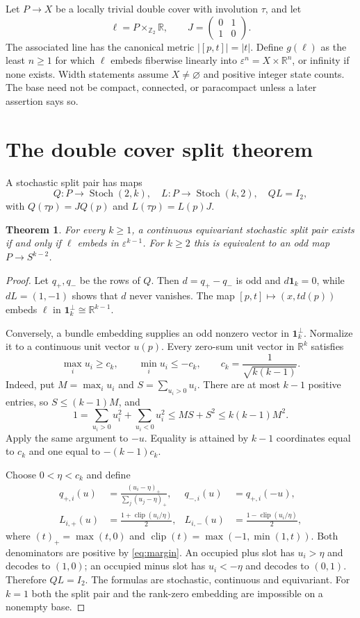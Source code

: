 \documentclass[11pt]{article}
\newtheorem{theorem}{Theorem}[section]
\theoremstyle{definition}
\newcommand{\R}{\mathbb R}
\newcommand{\one}{\mathbf 1}
\newcommand{\eps}{\varepsilon}
\newcommand{\St}{\operatorname{Stoch}}
\newcommand{\clip}{\operatorname{clip}}
\begin{document}
Let $P\to X$ be a locally trivial double cover with involution $\tau$, and let
\[
 \ell=P\times_{\mathbb Z_2}\R,\qquad
 J=\begin{pmatrix}0&1\\1&0\end{pmatrix}.
\]
The associated line has the canonical metric $|[p,t]|=|t|$. Define $g(\ell)$ as the least $n\geq1$ for which $\ell$ embeds fiberwise linearly into $\eps^n=X\times\R^n$, or infinity if none exists. Width statements assume $X\ne\varnothing$ and positive integer state counts. The base need not be compact, connected, or paracompact unless a later assertion says so.

\section{The double cover split theorem}
A stochastic split pair has maps
\[
 Q:P\to\St(2,k),\quad L:P\to\St(k,2),\quad QL=I_2,
\]
with $Q(\tau p)=JQ(p)$ and $L(\tau p)=L(p)J$.

\begin{theorem}\label{thm:double}
For every $k\geq1$, a continuous equivariant stochastic split pair exists if and only if $\ell$ embeds in $\eps^{k-1}$. For $k\geq2$ this is equivalent to an odd map $P\to S^{k-2}$.
\end{theorem}
\begin{proof}
Let $q_+,q_-$ be the rows of $Q$. Then $d=q_+-q_-$ is odd and $d\one_k=0$, while $dL=(1,-1)$ shows that $d$ never vanishes. The map $[p,t]\mapsto(x,t d(p))$ embeds $\ell$ in $\one_k^\perp\cong\R^{k-1}$.

Conversely, a bundle embedding supplies an odd nonzero vector in $\one_k^\perp$. Normalize it to a continuous unit vector $u(p)$. Every zero-sum unit vector in $\R^k$ satisfies
\begin{equation}\label{eq:margin}
 \max_i u_i\geq c_k,\qquad \min_i u_i\leq-c_k,
 \qquad c_k=\frac1{\sqrt{k(k-1)}}.
\end{equation}
Indeed, put $M=\max_i u_i$ and $S=\sum_{u_i>0}u_i$. There are at most $k-1$ positive entries, so $S\leq(k-1)M$, and
\[
 1=\sum_{u_i>0}u_i^2+\sum_{u_i<0}u_i^2
 \leq MS+S^2\leq k(k-1)M^2.
\]
Apply the same argument to $-u$. Equality is attained by $k-1$ coordinates equal to $c_k$ and one equal to $-(k-1)c_k$.

Choose $0<\eta<c_k$ and define
\begin{align}
 q_{+,i}(u)&=\frac{(u_i-\eta)_+}{\sum_j(u_j-\eta)_+},
 &q_{-,i}(u)&=q_{+,i}(-u),\label{eq:doubleQ}\\
 L_{i,+}(u)&=\frac{1+\clip(u_i/\eta)}2,
 &L_{i,-}(u)&=\frac{1-\clip(u_i/\eta)}2,\label{eq:doubleL}
\end{align}
where $(t)_+=\max(t,0)$ and $\clip(t)=\max(-1,\min(1,t))$. Both denominators are positive by \eqref{eq:margin}. An occupied plus slot has $u_i>\eta$ and decodes to $(1,0)$; an occupied minus slot has $u_i<-\eta$ and decodes to $(0,1)$. Therefore $QL=I_2$. The formulas are stochastic, continuous and equivariant. For $k=1$ both the split pair and the rank-zero embedding are impossible on a nonempty base.
\end{proof}
\end{document}
